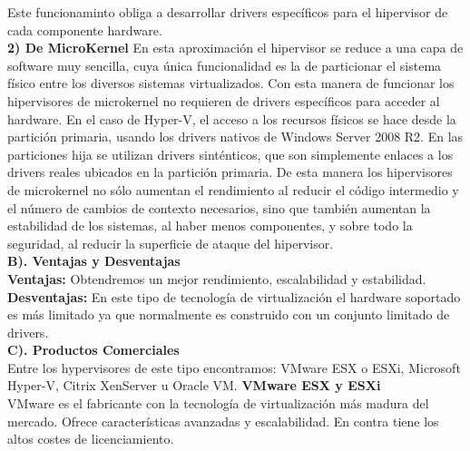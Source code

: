 \documentclass[twoside,twocolumn]{article}
\begin{document}
\begin{flushright}
\begin{itemize}
Este funcionaminto obliga a desarrollar drivers específicos para el hipervisor de cada componente hardware.\newline
\textbf{}\\

\textbf{2) De MicroKernel}\newline
En esta aproximación el hipervisor se reduce a una capa de software muy sencilla, cuya única funcionalidad es la de particionar el sistema físico entre los diversos sistemas virtualizados.\newline
Con esta manera de funcionar los hipervisores de microkernel no requieren de drivers específicos para acceder al hardware.\newline
En el caso de Hyper-V, el acceso a los recursos físicos se hace desde la partición primaria, usando los drivers nativos de Windows Server 2008 R2.\newline
En las particiones hija se utilizan drivers sinténticos, que son simplemente enlaces a los drivers reales ubicados en la partición primaria.\newline
De esta manera los hipervisores de microkernel no sólo aumentan el rendimiento al reducir el código intermedio y el número de cambios de contexto necesarios, sino que también aumentan la estabilidad de los sistemas, al haber menos componentes, y sobre todo la seguridad, al reducir la superficie de ataque del hipervisor.\newline
\textbf{}\\
 \textbf{B). Ventajas y Desventajas}\\
\textbf{Ventajas:}\newline
Obtendremos un mejor rendimiento, escalabilidad y estabilidad.\newline
\textbf{Desventajas:}\newline
En este tipo de tecnología de virtualización el hardware soportado es más limitado ya que normalmente es construido con un conjunto limitado de drivers.\newline
\textbf{}\\
\textbf{C). Productos Comerciales}\\
Entre los hypervisores de este tipo encontramos: VMware ESX o ESXi, Microsoft Hyper-V, Citrix XenServer u Oracle VM.\newline
\textbf{VMware ESX y ESXi}\\
VMware es el fabricante con la tecnología de virtualización más madura del mercado. Ofrece características avanzadas y escalabilidad. En contra tiene los altos costes de licenciamiento.\newline

\end{itemize}
\end{flushright}
\end{document}
